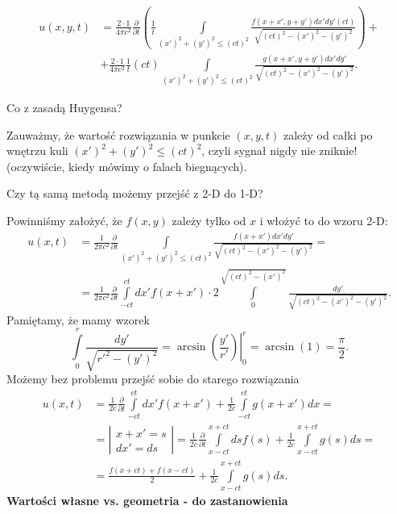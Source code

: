 \documentclass[../main.tex]{subfiles}
\begin{document}
		\begin{align*}
				u(x,y,t) &= \frac{2\cdot 1}{4\pi c^2} \frac{\partial }{\partial t} \left( \frac{1}{t}\int\limits_{(x')^2 + (y')^2 \le (ct)^2} \frac{f(x+x',y+y')dx'dy'(ct)}{\sqrt{(ct)^2 - (x')^2 - (y')^2}} \right) + \\
				&+ \frac{2 \cdot 1}{4\pi c^2} \frac{1}{t}(ct) \int\limits_{(x')^2 + (y')^2 \le (ct)^2} \frac{g(x+x', y+y')dx'dy'}{\sqrt{(ct)^2 - (x')^2 - (y')^2}}
		.\end{align*}
		\begin{pytanie}
				Co z zasadą Huygensa?
		\end{pytanie}
		Zauważmy, że wartość rozwiązania w punkcie $(x,y,t)$ zależy od całki po wnętrzu kuli $(x')^2 + (y')^2 \le (ct)^2$, czyli sygnał nigdy nie zniknie! (oczywiście, kiedy mówimy o falach biegnących).
		\begin{pytanie}
				Czy tą samą metodą możemy przejść z 2-D do 1-D?
		\end{pytanie}
		Powinniśmy założyć, że $f(x,y)$ zależy tylko od $x$ i włożyć to do wzoru 2-D:
		\begin{align*}
				u(x,t) &= \frac{1}{2\pi c^2} \frac{\partial }{\partial t} \int\limits_{(x')^2 + (y')^2 \le (ct)^2} \frac{f(x+x')dx'dy'}{\sqrt{(ct)^2 - (x')^2 - (y')^2}} = \\
				&= \frac{1}{2\pi c^2} \frac{\partial }{\partial t} \int\limits_{-ct}^{ct}dx' f(x+x') \cdot 2 \int\limits_0^{\sqrt{(ct)^2 - (x')^2} } \frac{dy'}{\sqrt{(ct)^2 - (x')^2 - (y')^2}}
		.\end{align*}
		Pamiętamy, że mamy wzorek
		\[
				\int\limits_0^r \frac{dy'}{\sqrt{r'^2 - (y')^2}}  = \left.\arcsin\left( \frac{y'}{r'} \right) \right|_0^r = \arcsin(1) = \frac{\pi}{2}
		.\]
		Możemy bez problemu przejść sobie do starego rozwiązania
		\begin{align*}
				u(x,t) &= \frac{1}{2c}\frac{\partial }{\partial t} \int\limits_{-ct}^{ct}dx' f(x+x') + \frac{1}{2c}\int\limits_{-ct}^{ct}g(x+x')dx = \\
				&= \left| \begin{matrix}x+x' = s\\ dx' = d s\end{matrix}\right| =  \frac{1}{2c}\frac{\partial }{\partial t} \int\limits_{x-ct}^{x+ct}d s f(s) + \frac{1}{2c} \int\limits_{x-ct}^{x+ct}g(s) d s = \\
						&= \frac{f(x+ct) + f(x-ct)}{2} + \frac{1}{2c} \int\limits_{x-ct}^{x+ct}g(s) d s
		.\end{align*}
		\textbf{Wartości własne vs. geometria - do zastanowienia}
\end{document}
